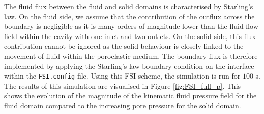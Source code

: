 \documentclass[oneside,11pt,times]{book}
\begin{document}
The fluid flux between the fluid and solid domains is characterised by Starling's law. On the fluid side, we assume that the contribution of the outflux across the boundary is negligible as it is many orders of magnitude lower than the fluid flow field within the cavity with one inlet and two outlets. On the solid side, this flux contribution cannot be ignored as the solid behaviour is closely linked to the movement of fluid within the poroelastic medium. The boundary flux is therefore implemented by applying the Starling's law boundary condition on the interface within the \verb|FSI.config| file. Using this FSI scheme, the simulation is run for $100$ s. The results of this simulation are visualised in Figure \ref{fig:FSI_full_p}. This shows the evolution of the magnitude of the kinematic fluid pressure field for the fluid domain compared to the increasing pore pressure for the solid domain.
\end{document}
